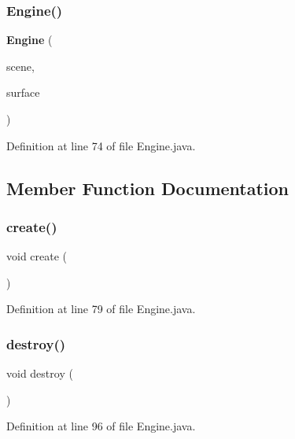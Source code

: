 \subsubsection{Engine()}
{\footnotesize\ttfamily \textbf{ Engine} (\begin{DoxyParamCaption}\item[{@Non\+Null \textbf{ Scene}}]{scene,  }\item[{@Non\+Null G\+L\+Surface\+View}]{surface }\end{DoxyParamCaption})}



Definition at line 74 of file Engine.\+java.



\subsection{Member Function Documentation}
\mbox{\label{classsf_1_1unitingtwist_1_1_engine_ae2ee59f7cc16ee42559c87e81c433039}} 
\subsubsection{create()}
{\footnotesize\ttfamily void create (\begin{DoxyParamCaption}{ }\end{DoxyParamCaption})}



Definition at line 79 of file Engine.\+java.

\mbox{\label{classsf_1_1unitingtwist_1_1_engine_a3a80b6032f86a56bec74609034b3246f}} 
\subsubsection{destroy()}
{\footnotesize\ttfamily void destroy (\begin{DoxyParamCaption}{ }\end{DoxyParamCaption})}



Definition at line 96 of file Engine.\+java.

\mbox{\label{classsf_1_1unitingtwist_1_1_engine_a9b17fb9e1ca3c4f937cddc62c84770c2}} 
